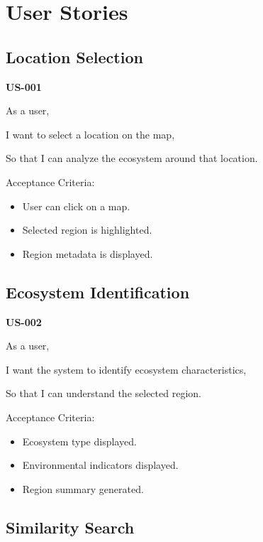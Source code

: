 \documentclass[11pt,a4paper]{article}
\begin{document}
\section{User Stories}

\subsection{Location Selection}

\textbf{US-001}

As a user,

I want to select a location on the map,

So that I can analyze the ecosystem around that location.

\vspace{0.5cm}

Acceptance Criteria:

\begin{itemize}
\item User can click on a map.
\item Selected region is highlighted.
\item Region metadata is displayed.
\end{itemize}


\subsection{Ecosystem Identification}

\textbf{US-002}

As a user,

I want the system to identify ecosystem characteristics,

So that I can understand the selected region.

Acceptance Criteria:

\begin{itemize}
\item Ecosystem type displayed.
\item Environmental indicators displayed.
\item Region summary generated.
\end{itemize}


\subsection{Similarity Search}
\end{document}
